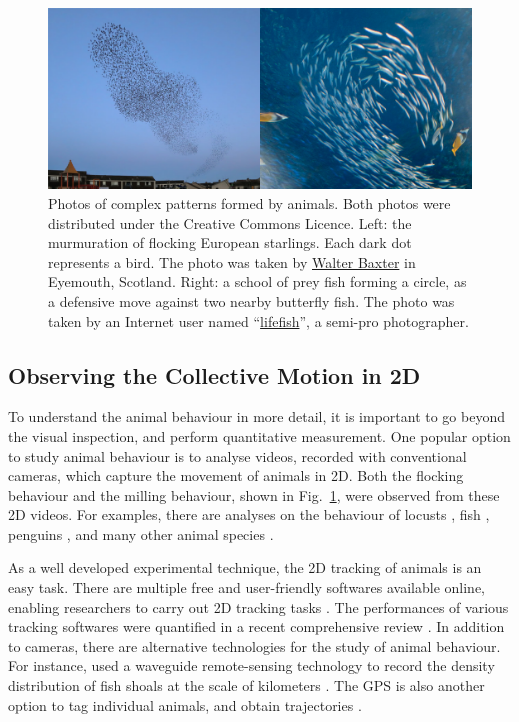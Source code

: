 \documentclass[11pt,twoside]{report}
\begin{document}
\begin{figure}
  \includegraphics[width=\linewidth]{animals}
  \caption[Complex patterns formed by animals]{
  Photos of complex patterns formed by animals. Both photos were distributed under the Creative Commons Licence.
  Left: the murmuration of flocking European starlings. Each dark dot represents a bird. The photo was taken by \href{https://www.geograph.org.uk/photo/6389346}{Walter Baxter} in Eyemouth, Scotland.
  Right: a school of prey fish forming a circle, as a defensive move against two nearby butterfly fish. The photo was taken by an Internet user named ``\href{http://www.freeimageslive.co.uk/free_stock_image/butterfly-fish-jpg}{lifefish}'', a semi-pro photographer.
  }
  \label{fig:animals}
\end{figure}

\subsection{Observing the Collective Motion in 2D}

To understand the animal behaviour in more detail, it is important to go beyond the visual inspection, and perform quantitative measurement.
One popular option to study animal behaviour is to analyse videos, recorded with conventional cameras, which capture the movement of animals in 2D.
Both the flocking behaviour and the milling behaviour, shown in Fig.~\ref{fig:animals}, were observed from these 2D videos.
For examples, there are analyses on the behaviour of locusts \cite{buhl2006, yates2009}, fish \cite{becco2006, fontaine2008, puckett2018, macgregor2020}, penguins \cite{gerum2013, gerum2018}, and many other animal species \cite{mersch2013, feinerman2018, mendez-valderrama2018, ginelli2015pnas}.


As a well developed experimental technique, the 2D tracking of animals is an easy task. There are multiple free and user-friendly softwares available online, enabling researchers to carry out 2D tracking tasks \cite{perez-escudero2014, rodriguez2017, romero-ferrero2019, walter2021}. The performances of various tracking softwares were quantified in a recent comprehensive review \cite{panadeiro2021}.
In addition to cameras, there are alternative technologies for the study of animal behaviour. For instance, \citeauthor{makris2006} used a waveguide remote-sensing technology to record the density distribution of fish shoals at the scale of kilometers \cite{makris2006, makris2009}.
The GPS is also another option to tag individual animals, and obtain trajectories \cite{papageorgiou2020}.
\end{document}
